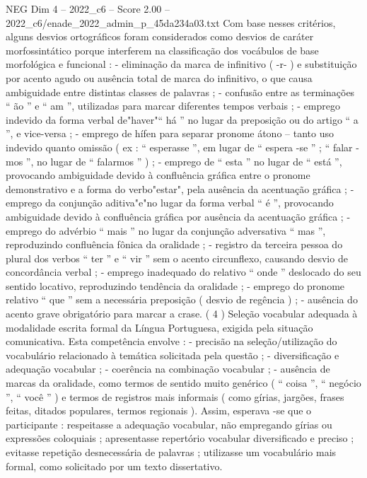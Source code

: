 \begin{textsample}{NEG Dim 4 – 2022\_c6 – Score 2.00 – 2022\_c6/enade\_2022\_admin\_p\_45da234a03.txt}
Com base nesses critérios, alguns desvios ortográficos foram considerados como desvios de caráter morfossintático porque interferem na classificação dos vocábulos de base morfológica e funcional : - eliminação da marca de infinitivo ( -r- ) e substituição por acento agudo ou ausência total de marca do infinitivo, o que causa ambiguidade entre distintas classes de palavras ; - confusão entre as terminações “ ão ” e “ am ”, utilizadas para marcar diferentes tempos verbais ; - emprego indevido da forma verbal de"haver"“ há ” no lugar da preposição ou do artigo “ a ”, e vice-versa ; - emprego de hífen para separar pronome átono – tanto uso indevido quanto omissão ( ex : “ esperasse ”, em lugar de “ espera -se ” ; “ falar -mos ”, no lugar de “ falarmos ” ) ; - emprego de “ esta ” no lugar de “ está ”, provocando ambiguidade devido à confluência gráfica entre o pronome demonstrativo e a forma do verbo"estar", pela ausência da acentuação gráfica ; - emprego da conjunção aditiva"e"no lugar da forma verbal “ é ”, provocando ambiguidade devido à confluência gráfica por ausência da acentuação gráfica ; - emprego do advérbio “ mais ” no lugar da conjunção adversativa “ mas ”, reproduzindo confluência fônica da oralidade ; - registro da terceira pessoa do plural dos verbos “ ter ” e “ vir ” sem o acento circunflexo, causando desvio de concordância verbal ; - emprego inadequado do relativo “ onde ” deslocado do seu sentido locativo, reproduzindo tendência da oralidade ; - emprego do pronome relativo “ que ” sem a necessária preposição ( desvio de regência ) ; - ausência do acento grave obrigatório para marcar a crase. ( 4 ) Seleção vocabular adequada à modalidade escrita formal da Língua Portuguesa, exigida pela situação comunicativa.
Esta competência envolve : - precisão na seleção/utilização do vocabulário relacionado à temática solicitada pela questão ; - diversificação e adequação vocabular ; - coerência na combinação vocabular ; - ausência de marcas da oralidade, como termos de sentido muito genérico ( “ coisa ”, “ negócio ”, “ você ” ) e termos de registros mais informais ( como gírias, jargões, frases feitas, ditados populares, termos regionais ).
Assim, esperava -se que o participante : respeitasse a adequação vocabular, não empregando gírias ou expressões coloquiais ; apresentasse repertório vocabular diversificado e preciso ; evitasse repetição desnecessária de palavras ; utilizasse um vocabulário mais formal, como solicitado por um texto dissertativo.

\end{textsample}

